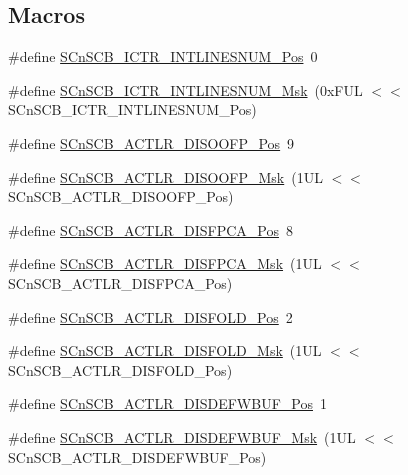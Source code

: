 \subsection*{Macros}
\begin{DoxyCompactItemize}
\item 
\#define \hyperlink{group___c_m_s_i_s___s_cn_s_c_b_ga0777ddf379af50f9ca41d40573bfffc5}{S\+Cn\+S\+C\+B\+\_\+\+I\+C\+T\+R\+\_\+\+I\+N\+T\+L\+I\+N\+E\+S\+N\+U\+M\+\_\+\+Pos}~0
\item 
\#define \hyperlink{group___c_m_s_i_s___s_cn_s_c_b_ga3efa0f5210051464e1034b19fc7b33c7}{S\+Cn\+S\+C\+B\+\_\+\+I\+C\+T\+R\+\_\+\+I\+N\+T\+L\+I\+N\+E\+S\+N\+U\+M\+\_\+\+Msk}~(0x\+F\+U\+L $<$$<$ S\+Cn\+S\+C\+B\+\_\+\+I\+C\+T\+R\+\_\+\+I\+N\+T\+L\+I\+N\+E\+S\+N\+U\+M\+\_\+\+Pos)
\item 
\#define \hyperlink{group___c_m_s_i_s___s_cn_s_c_b_gaff0b57464c60fea8182b903676f8de49}{S\+Cn\+S\+C\+B\+\_\+\+A\+C\+T\+L\+R\+\_\+\+D\+I\+S\+O\+O\+F\+P\+\_\+\+Pos}~9
\item 
\#define \hyperlink{group___c_m_s_i_s___s_cn_s_c_b_ga1ecd6adafa43464d7097b132c19e8640}{S\+Cn\+S\+C\+B\+\_\+\+A\+C\+T\+L\+R\+\_\+\+D\+I\+S\+O\+O\+F\+P\+\_\+\+Msk}~(1\+U\+L $<$$<$ S\+Cn\+S\+C\+B\+\_\+\+A\+C\+T\+L\+R\+\_\+\+D\+I\+S\+O\+O\+F\+P\+\_\+\+Pos)
\item 
\#define \hyperlink{group___c_m_s_i_s___s_cn_s_c_b_gaa194809383bc72ecf3416d85709281d7}{S\+Cn\+S\+C\+B\+\_\+\+A\+C\+T\+L\+R\+\_\+\+D\+I\+S\+F\+P\+C\+A\+\_\+\+Pos}~8
\item 
\#define \hyperlink{group___c_m_s_i_s___s_cn_s_c_b_ga10d5aa4a196dcde6f476016ece2c1b69}{S\+Cn\+S\+C\+B\+\_\+\+A\+C\+T\+L\+R\+\_\+\+D\+I\+S\+F\+P\+C\+A\+\_\+\+Msk}~(1\+U\+L $<$$<$ S\+Cn\+S\+C\+B\+\_\+\+A\+C\+T\+L\+R\+\_\+\+D\+I\+S\+F\+P\+C\+A\+\_\+\+Pos)
\item 
\#define \hyperlink{group___c_m_s_i_s___s_cn_s_c_b_gaab395870643a0bee78906bb15ca5bd02}{S\+Cn\+S\+C\+B\+\_\+\+A\+C\+T\+L\+R\+\_\+\+D\+I\+S\+F\+O\+L\+D\+\_\+\+Pos}~2
\item 
\#define \hyperlink{group___c_m_s_i_s___s_cn_s_c_b_gaa9dd2d4a2350499188f438d0aa9fd982}{S\+Cn\+S\+C\+B\+\_\+\+A\+C\+T\+L\+R\+\_\+\+D\+I\+S\+F\+O\+L\+D\+\_\+\+Msk}~(1\+U\+L $<$$<$ S\+Cn\+S\+C\+B\+\_\+\+A\+C\+T\+L\+R\+\_\+\+D\+I\+S\+F\+O\+L\+D\+\_\+\+Pos)
\item 
\#define \hyperlink{group___c_m_s_i_s___s_cn_s_c_b_gafa2eb37493c0f8dae77cde81ecf80f77}{S\+Cn\+S\+C\+B\+\_\+\+A\+C\+T\+L\+R\+\_\+\+D\+I\+S\+D\+E\+F\+W\+B\+U\+F\+\_\+\+Pos}~1
\item 
\#define \hyperlink{group___c_m_s_i_s___s_cn_s_c_b_ga6cda7b7219232a008ec52cc8e89d5d08}{S\+Cn\+S\+C\+B\+\_\+\+A\+C\+T\+L\+R\+\_\+\+D\+I\+S\+D\+E\+F\+W\+B\+U\+F\+\_\+\+Msk}~(1\+U\+L $<$$<$ S\+Cn\+S\+C\+B\+\_\+\+A\+C\+T\+L\+R\+\_\+\+D\+I\+S\+D\+E\+F\+W\+B\+U\+F\+\_\+\+Pos)
$$
\end{DoxyCompactItemize}
